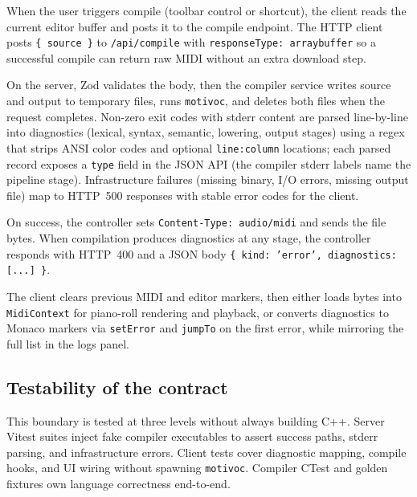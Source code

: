 When the user triggers compile (toolbar control or shortcut), the client reads the current editor buffer and posts it
to the compile endpoint.
The HTTP client posts \texttt{\{ source \}} to \texttt{/api/compile} with \texttt{responseType: arraybuffer} so a
successful compile can return raw MIDI without an extra download step.

On the server, Zod validates the body, then the compiler service writes source and output to temporary files, runs
\texttt{motivoc}, and deletes both files when the request completes.
Non-zero exit codes with stderr content are parsed line-by-line into diagnostics (lexical, syntax, semantic, lowering,
output stages) using a regex that strips ANSI color codes and optional \texttt{line:column} locations; each parsed
record exposes a \texttt{type} field in the JSON API (the compiler stderr labels name the pipeline stage).
Infrastructure failures (missing binary, I/O errors, missing output file) map to HTTP~500 responses with stable error
codes for the client.

On success, the controller sets \texttt{Content-Type: audio/midi} and sends the file bytes.
When compilation produces diagnostics at any stage, the controller responds with HTTP~400 and a JSON body
\texttt{\{ kind: 'error', diagnostics: [...] \}}.

The client clears previous MIDI and editor markers, then either loads bytes into \texttt{MidiContext} for piano-roll
rendering and playback, or converts diagnostics to Monaco markers via \texttt{setError} and \texttt{jumpTo} on the first
error, while mirroring the full list in the logs panel.

\subsection{Testability of the contract}\label{subsec:compile-contract-tests}

This boundary is tested at three levels without always building C++.
Server Vitest suites inject fake compiler executables to assert success paths, stderr parsing, and infrastructure
errors.
Client tests cover diagnostic mapping, compile hooks, and UI wiring without spawning \texttt{motivoc}.
Compiler CTest and golden fixtures own language correctness end-to-end.
